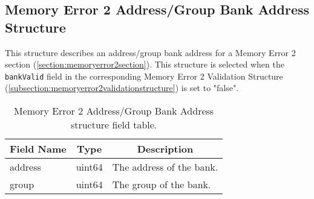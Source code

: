 \documentclass{report}
\newcommand*{\thead}[1]{\multicolumn{1}{|c|}{\bfseries #1}}
\newcommand*{\jsontable}[1]{
    \begin{table}[!ht]
    \label{#1}
    \centering
    \begin{adjustbox}{center}
    \begin{tabular}{|l|c|p{8cm}|}
    \hline
    \thead{Field Name} & \thead{Type} & \thead{Description} \\
    \hline
}
\newcommand*{\jsontableend}[1]{
    \hline
    \end{tabular}
    \end{adjustbox}
    \caption{#1}
    \label{table:#1}
    \end{table}
    \FloatBarrier
}
\begin{document}
\subsection{Memory Error 2 Address/Group Bank Address Structure}
\label{subsection:memoryerror2addressgroupbankaddressstructure}
This structure describes an address/group bank address for a Memory Error 2 section (\ref{section:memoryerror2section}). This structure is selected when the \texttt{bankValid} field in the corresponding Memory Error 2 Validation Structure (\ref{subsection:memoryerror2validationstructure}) is set to "false".
\jsontable{table:memoryerror2addressgroupbankaddressstructure}
address & uint64 & The address of the bank.\\
\hline
group & uint64 & The group of the bank.\\
\jsontableend{Memory Error 2 Address/Group Bank Address structure field table.}

\end{document}
